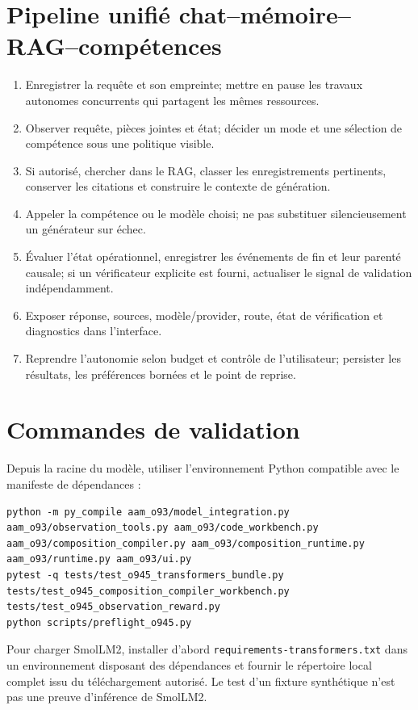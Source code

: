 \documentclass[11pt,a4paper]{article}
\begin{document}
\section{Pipeline unifié chat--mémoire--RAG--compétences}
\begin{enumerate}
\item Enregistrer la requête et son empreinte; mettre en pause les travaux autonomes concurrents qui partagent les mêmes ressources.
\item Observer requête, pièces jointes et état; décider un mode et une sélection de compétence sous une politique visible.
\item Si autorisé, chercher dans le RAG, classer les enregistrements pertinents, conserver les citations et construire le contexte de génération.
\item Appeler la compétence ou le modèle choisi; ne pas substituer silencieusement un générateur sur échec.
\item Évaluer l'état opérationnel, enregistrer les événements de fin et leur parenté causale; si un vérificateur explicite est fourni, actualiser le signal de validation indépendamment.
\item Exposer réponse, sources, modèle/provider, route, état de vérification et diagnostics dans l'interface.
\item Reprendre l'autonomie selon budget et contrôle de l'utilisateur; persister les résultats, les préférences bornées et le point de reprise.
\end{enumerate}

\section{Commandes de validation}
Depuis la racine du modèle, utiliser l'environnement Python compatible avec le manifeste de dépendances :
\begin{verbatim}
python -m py_compile aam_o93/model_integration.py aam_o93/observation_tools.py aam_o93/code_workbench.py aam_o93/composition_compiler.py aam_o93/composition_runtime.py aam_o93/runtime.py aam_o93/ui.py
pytest -q tests/test_o945_transformers_bundle.py tests/test_o945_composition_compiler_workbench.py tests/test_o945_observation_reward.py
python scripts/preflight_o945.py
\end{verbatim}
Pour charger SmolLM2, installer d'abord \texttt{requirements-transformers.txt} dans un environnement disposant des dépendances et fournir le répertoire local complet issu du téléchargement autorisé. Le test d'un fixture synthétique n'est pas une preuve d'inférence de SmolLM2.
\end{document}
